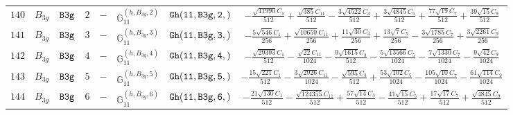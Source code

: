 \documentclass[fleqn,8pt]{jsarticle}
\begin{document}
\begin{table}[ht!]
\begin{center}
\begin{tabular}{cccccccc}
$ 140 $ & $ B_{3g} $ & $ {\tt B3g} $ & $ 2 $ & $ - $ & $ \mathbb{G}_{11}^{(h,B_{3g},2)} $ & $ {\tt Gh(11,B3g,2,)} $ & $ - \frac{\sqrt{41990} C_{1}}{512} + \frac{\sqrt{385} C_{11}}{512} - \frac{3 \sqrt{4522} C_{3}}{512} + \frac{3 \sqrt{4845} C_{5}}{512} + \frac{77 \sqrt{19} C_{7}}{512} + \frac{39 \sqrt{15} C_{9}}{512} $ \\
$ 141 $ & $ B_{3g} $ & $ {\tt B3g} $ & $ 3 $ & $ - $ & $ \mathbb{G}_{11}^{(h,B_{3g},3)} $ & $ {\tt Gh(11,B3g,3,)} $ & $ - \frac{5 \sqrt{546} C_{1}}{256} + \frac{\sqrt{10659} C_{11}}{256} + \frac{11 \sqrt{30} C_{3}}{256} + \frac{13 \sqrt{7} C_{5}}{256} - \frac{3 \sqrt{1785} C_{7}}{256} + \frac{3 \sqrt{2261} C_{9}}{256} $ \\
$ 142 $ & $ B_{3g} $ & $ {\tt B3g} $ & $ 4 $ & $ - $ & $ \mathbb{G}_{11}^{(h,B_{3g},4)} $ & $ {\tt Gh(11,B3g,4,)} $ & $ - \frac{\sqrt{29393} C_{1}}{512} - \frac{\sqrt{22} C_{11}}{1024} - \frac{9 \sqrt{1615} C_{3}}{512} - \frac{5 \sqrt{13566} C_{5}}{1024} - \frac{7 \sqrt{1330} C_{7}}{1024} - \frac{9 \sqrt{42} C_{9}}{1024} $ \\
$ 143 $ & $ B_{3g} $ & $ {\tt B3g} $ & $ 5 $ & $ - $ & $ \mathbb{G}_{11}^{(h,B_{3g},5)} $ & $ {\tt Gh(11,B3g,5,)} $ & $ - \frac{15 \sqrt{221} C_{1}}{512} - \frac{3 \sqrt{2926} C_{11}}{1024} - \frac{\sqrt{595} C_{3}}{512} + \frac{53 \sqrt{102} C_{5}}{1024} - \frac{105 \sqrt{10} C_{7}}{1024} - \frac{61 \sqrt{114} C_{9}}{1024} $ \\
$ 144 $ & $ B_{3g} $ & $ {\tt B3g} $ & $ 6 $ & $ - $ & $ \mathbb{G}_{11}^{(h,B_{3g},6)} $ & $ {\tt Gh(11,B3g,6,)} $ & $ - \frac{21 \sqrt{130} C_{1}}{512} - \frac{\sqrt{124355} C_{11}}{512} + \frac{57 \sqrt{14} C_{3}}{512} - \frac{41 \sqrt{15} C_{5}}{512} + \frac{17 \sqrt{17} C_{7}}{512} + \frac{\sqrt{4845} C_{9}}{512} $ \\
 \hline \hline
\end{tabular}
\end{center}
\end{table}
\end{document}
